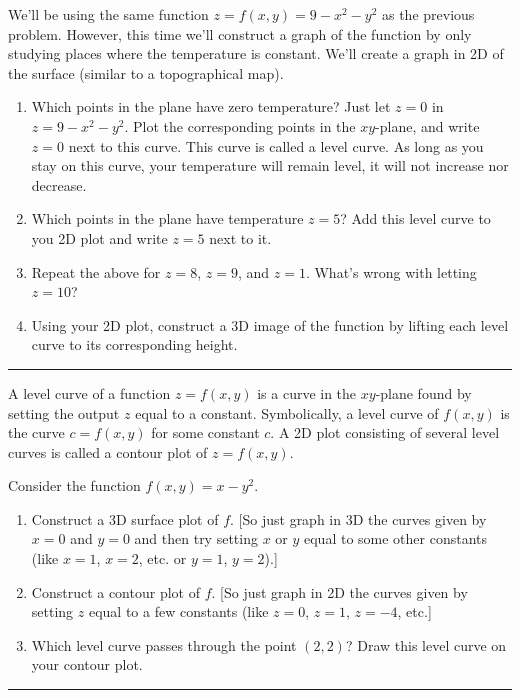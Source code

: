 \begin{problem}\label{cake level curves plot}%
%
 We'll be using the same function $z=f(x,y)=9-x^2-y^2$ as the previous problem.  However, this time we'll construct a graph of the function by only studying places where the temperature is constant.  We'll create a graph in 2D of the surface (similar to a topographical map). 
 \begin{enumerate}
  \item%
%
Which points in the plane have zero temperature? Just let $z=0$ in $z=9-x^2-y^2$. Plot the corresponding points in the $xy$-plane, and write $z=0$ next to this curve. This curve is called a level curve. As long as you stay on this curve, your temperature will remain level, it will not increase nor decrease. 
  \item Which points in the plane have temperature $z=5$?  Add this level curve to you 2D plot and write $z=5$ next to it.
  \item Repeat the above for $z=8$, $z=9$, and $z=1$. What's wrong with letting $z=10$? 
  \item Using your 2D plot, construct a 3D image of the function by lifting each level curve to its corresponding height.
 \end{enumerate}
\hrule\end{problem}

\begin{definition}
 A level curve of a function $z=f(x,y)$ is a curve in the $xy$-plane found by setting the output $z$ equal to a constant. Symbolically, a level curve of $f(x,y)$ is the curve $c=f(x,y)$ for some constant $c$.  A 2D plot consisting of several level curves is called a contour plot of $z=f(x,y)$.
\end{definition}

\begin{problem}%
%
 Consider the function $f(x,y)=x-y^2$.
\begin{enumerate}
 \item Construct a 3D surface plot of $f$. [So just graph in 3D the curves given by $x=0$ and $y=0$ and then try setting $x$ or $y$ equal to some other constants (like $x=1$, $x=2$, etc. or $y=1$, $y=2$).]
 \item Construct a contour plot of $f$. [So just graph in 2D the curves given by setting $z$ equal to a few constants (like $z=0$, $z=1$, $z=-4$, etc.]
 \item%
%
Which level curve passes through the point $(2,2)$?  Draw this level curve on your contour plot.
\end{enumerate}
\hrule\end{problem}

